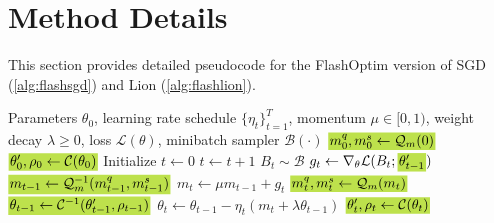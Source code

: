 \documentclass[10pt,twocolumn,letterpaper]{article}
\theoremstyle{plain}
\theoremstyle{definition}
\theoremstyle{remark}
\newcommand{\flashOptim}{FlashOptim\xspace}
\newcommand{\hlcolor}{SpringGreen}
\newcommand{\hlchange}[1]{{{\fboxsep=1pt\text{\colorbox{\hlcolor}{$#1$}}}}}
\newcommand{\hltext}[1]{\colorbox{\hlcolor}{#1}}
\newcommand{\thetalp}{\theta^\prime}
\begin{document}
\clearpage
\appendix


\section{Method Details}
\label{sec:appendix_method}

This section provides detailed pseudocode for the \flashOptim version of SGD (\autoref{alg:flashsgd}) and Lion (\autoref{alg:flashlion}).

    

\begin{algorithm}[!h]
    \caption{FlashSGD: Memory-Efficient SGD. We \hltext{highlight} the changes from SGD.}
    \label{alg:flashsgd}
    \begin{algorithmic}[1]
    \Require Parameters $\theta_0$, learning rate schedule $\{\eta_t\}_{t=1}^{T}$, momentum $\mu \in [0,1)$, weight decay $\lambda \geq 0$, loss $\mathcal{L}(\theta)$, minibatch sampler $\mathcal{B}(\cdot)$
    \State $\hlchange{m_0^q, m_0^s \gets \mathcal{Q}_m(0)}$
    \State $\hlchange{\thetalp_0, \rho_0 \gets \mathcal{C}(\theta_0)}$
    \State Initialize $t \gets 0$
        \State $t \gets t + 1$
        \State $B_t \sim \mathcal{B}$
        \State $g_t \gets \nabla_\theta \mathcal{L}(B_t; \hlchange{\thetalp_{t-1}})$
        \State $\hlchange{m_{t-1} \gets \mathcal{Q}_m^{-1}(m^q_{t-1}, m^s_{t-1})}$
        \State $m_t \gets \mu m_{t-1} + g_t$
        \State $\hlchange{m^q_t, m^s_t \gets \mathcal{Q}_m(m_t)}$
        \State $\hlchange{\theta_{t-1} \gets \mathcal{C}^{-1}(\thetalp_{t-1}, \rho_{t-1})}$
        \State $\theta_t \gets \theta_{t-1} - \eta_t (m_t + \lambda \theta_{t-1})$
        \State $\hlchange{\thetalp_t, \rho_t \gets \mathcal{C}(\theta_t)}$
    \EndWhile
    \end{algorithmic}
    \end{algorithm}
\end{document}
